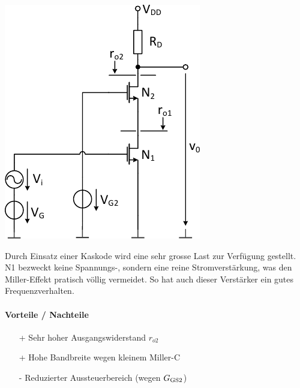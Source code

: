 \begin{minipage}[t]{0.3\columnwidth}
    \includegraphics[width=\columnwidth, align=t]{images/07_kaskodenverstaerker.pdf}
\end{minipage}
\hfill
\begin{minipage}[t]{0.66\columnwidth}
    Durch Einsatz einer Kaskode wird eine sehr grosse Last zur Verfügung gestellt. 
    N1 bezweckt keine Spannungs-, sondern eine reine Stromverstärkung, was den Miller-Effekt pratisch völlig vermeidet.
    So hat auch dieser Verstärker ein gutes Frequenzverhalten.

    \paragraph{Vorteile / Nachteile}
    \raggedright

     \begin{itemize}
        \item[+] Sehr hoher Ausgangswiderstand $r_{o2}$
        \item[+] Hohe Bandbreite wegen kleinem Miller-C
        \item[-] Reduzierter Aussteuerbereich (wegen $G_{\rm GS2}$)
     \end{itemize}
\end{minipage}


